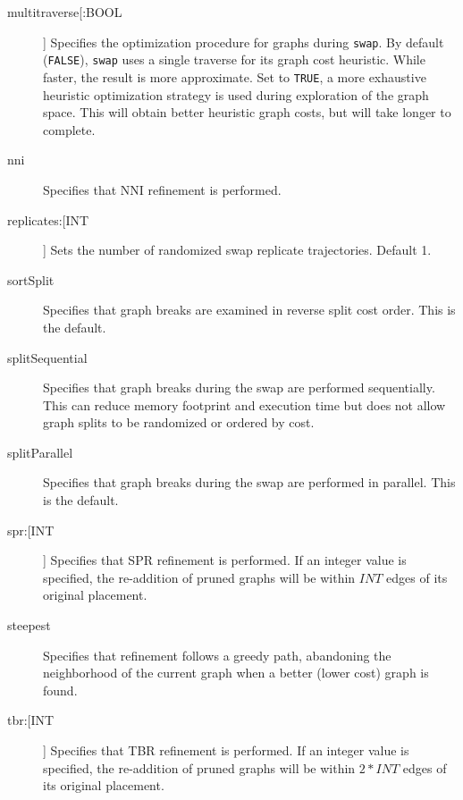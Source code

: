 \begin{description}
\begin{description}
		\end{description}  
		
		\item[multitraverse[:BOOL ]] Specifies the optimization procedure for graphs during 
		\texttt{swap}. By default (\texttt{FALSE}), \texttt{swap} uses a single traverse for its graph 
		cost heuristic. While faster, the result is more approximate. Set to \texttt{TRUE}, a more 
		exhaustive heuristic optimization strategy is used during exploration of the graph space. 
		This will obtain better heuristic graph costs, but will take longer to complete.
		
		\item[nni] Specifies that NNI refinement \citep{CaminandSokal1965, Robinson1971} 
		is performed.
		
		\item[replicates:[INT]] Sets the number of randomized swap replicate trajectories. 
		Default 1.
		
		\item[sortSplit] Specifies that graph breaks are examined in reverse split cost order.
		This is the default.
		
		\item[splitSequential] Specifies that graph breaks during the swap are performed sequentially.
		This can reduce memory footprint and execution time but does not allow graph splits to be 
		randomized or ordered by cost.

		\item[splitParallel] Specifies that graph breaks during the swap are performed in parallel.
		This is the default.
		
		\item[spr:[INT]] Specifies that SPR refinement \citep{Dayhoff1969} is performed. If an 
		integer value is specified, the re-addition of pruned graphs will be within $INT$ 
		edges of its original placement.
		
		\item[steepest] Specifies that refinement follows a greedy path, abandoning the 
		neighborhood of the current graph when a better (lower cost) graph is found. 		
		
		\item[tbr:[INT]] Specifies that TBR refinement \citep{Farris1988, swofford1990a} 
		is performed. If an integer value is specified, the re-addition of pruned graphs 
		will be within $2 * INT$ edges of its original placement.
		
	\end{description}	
		
